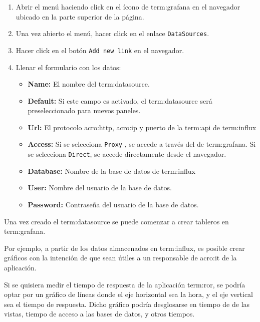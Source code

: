 \begin{enumerate}
  \item Abrir el menú haciendo click en el ícono de \gls{term:grafana} en el
  navegador ubicado en la parte superior de la página.

  \item Una vez abierto el menú, hacer click en el enlace \texttt{DataSources}.
  \item Hacer click en el botón \texttt{Add new link} en el navegador.
  \item Llenar el formulario con los datos:
    \begin{itemize}
      \item \textbf{Name:}
      El nombre del \gls{term:datasource}.

      \item \textbf{Default:}
      Si este campo es activado, el \gls{term:datasource} será preseleccionado
      para nuevos paneles.

      \item \textbf{Url:}
      El protocolo \gls{acro:http}, \gls{acro:ip} y puerto de la \gls{term:api}
      de \gls{term:influx}

      \item \textbf{Access:}
      Si se selecciona \texttt{Proxy} , se accede a través del  de
      \gls{term:grafana}.
      Si se selecciona \texttt{Direct}, se accede directamente desde el
      navegador.

      \item \textbf{Database:}
      Nombre de la base de datos de \gls{term:influx}

      \item \textbf{User:}
      Nombre del usuario de la base de datos.

      \item \textbf{Password:}
      Contraseña del usuario de la base de datos.

    \end{itemize}
\end{enumerate}

Una vez creado el \gls{term:datasource} se puede comenzar a crear tableros
en \gls{term:grafana}.

Por ejemplo, a partir de los datos almacenados en \gls{term:influx}, es posible
crear gráficos con la intención de que sean útiles a un responsable de
\gls{acro:it} de la aplicación.

Si se quisiera medir el tiempo de respuesta de la aplicación \gls{term:ror},
se podría optar por un gráfico de líneas donde el eje horizontal sea la hora, y
el eje vertical sea el tiempo de respuesta. Dicho gráfico podría desglosarse en
tiempo de  de las vistas, tiempo de acceso a las bases de
datos, y otros tiempos.

